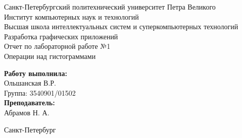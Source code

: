 \begin{titlepage}	%
	
	\begin{center}		%
		
		\large Санкт-Петербургский политехнический университет Петра Великого\\
		\large Институт компьютерных наук и технологий \\
		\large Высшая школа интеллектуальных систем и суперкомпьютерных технологий\\[6cm]
		
		\huge Разработка графических приложений\\[0.5cm] %
		\large Отчет по лабораторной работе №1\\[0.1cm]
		\large Операции над гистограммами\\[5cm]
		
	\end{center}
	
	
	\begin{flushright} %
		\begin{minipage}{0.25\textwidth} %
			\begin{flushleft} %
				
				\large\textbf{Работу выполнила:}\\
				\large Ольшанская В.Р.\\
				\large {Группа:} 3540901/01502\\
				
				\large \textbf{Преподаватель:}\\
				\large Абрамов Н. А.
				
			\end{flushleft}
		\end{minipage}
	\end{flushright}
	
	\vfill %
	
	\begin{center}
		\large Санкт-Петербург\\
		\large \the\year %
	\end{center} %
	
\end{titlepage} %

\vfill %
